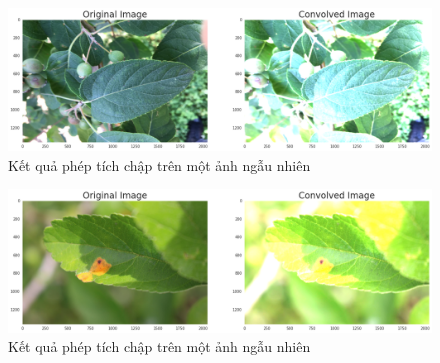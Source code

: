 \documentclass{article}
\begin{document}
	\begin{figure}[H]
		\centering
		\includegraphics[width=1\linewidth]{images/conv_1.png}
		\caption{Kết quả phép tích chập trên một ảnh ngẫu nhiên}
		\label{fig:writing-thesis}
	\end{figure}
	\begin{figure}[H]
		\centering
		\includegraphics[width=1\linewidth]{images/conv_2.png}
		\caption{Kết quả phép tích chập trên một ảnh ngẫu nhiên}
		\label{fig:writing-thesis}
	\end{figure}
\end{document}
